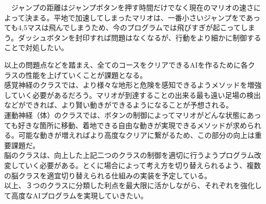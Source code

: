 \documentclass[a4j]{jarticle}
\begin{document}
\begin{description}
\begin{center}
\end{center}
　ジャンプの距離はジャンプボタンを押す時間だけでなく現在のマリオの速さによって決まる。平地で加速してしまったマリオは、一番小さいジャンプをであっても4,5マスは飛んでしまうため、今のプログラムでは飛びすぎが起こってしまう。ダッシュボタンを封印すれば問題はなくなるが、行動をより細かに制御することで対処したい。
\end{description}

以上の問題点などを踏まえ、全てのコースをクリアできるAIを作るために各クラスの性能を上げていくことが課題となる。
\\

感覚神経のクラスでは、より様々な地形と危険を感知できるようメソッドを増強していく必要があるだろう。マリオが到達することの出来る最も遠い足場の検出などができれば、より賢い動きができるようになることが予想される。
\\

運動神経（体）のクラスでは、ボタンの制御によってマリオがどんな状態にあっても好きな箇所に移動、着地できる自由な動きが実現できるメソッドが求められる。可能な動きが増えればより高度なクリアに繋がるため、この部分の向上は重要課題だ。
\\

脳のクラスは、向上した上記二つのクラスの制御を適切に行うようプログラム改変していく必要がある。とくに場合によって考え方を切り替えられるよう、複数の脳クラスを適宜切り替えられる仕組みの実装を予定している。
\\

以上、３つのクラスに分類した利点を最大限に活かしながら、それぞれを強化して高度なAIプログラムを実現していきたい。
\end{document}
